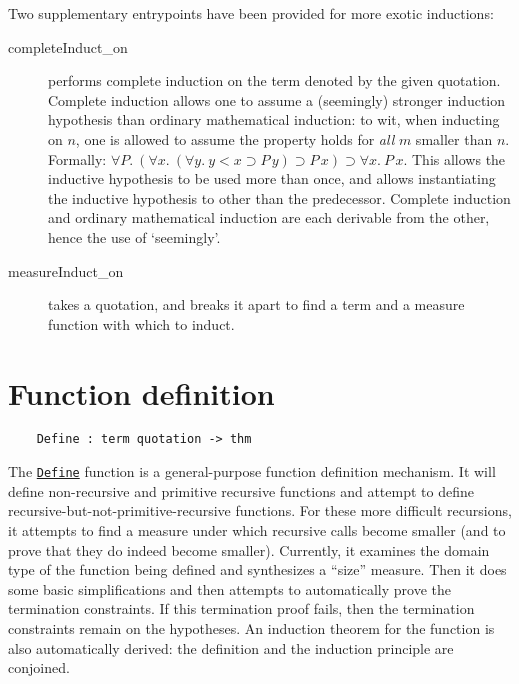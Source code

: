 \documentclass[12pt,fleqn,a4paper]{report}
\begin{document}
Two supplementary entrypoints have been provided for more exotic
inductions:
\begin{description}
\item [completeInduct\_on] performs complete
induction on the term denoted by the given quotation. Complete induction allows one to assume a
(seemingly) stronger induction hypothesis than ordinary mathematical
induction: to wit, when inducting on
$n$, one is allowed to assume the property holds for {\it all\/} $m$
smaller than $n$. Formally: $\forall P.\ (\forall x.\ (\forall y.\ y < x
\supset P\, y) \supset P\,x) \supset \forall x.\ P\,x$. This allows the
inductive hypothesis to be used more than once, and allows instantiating
the inductive hypothesis to other than the predecessor. Complete
induction and ordinary mathematical induction are each derivable from
the other, hence the use of `seemingly'.
\item [measureInduct\_on] takes a quotation, and breaks it apart
to find a term and a measure function with which to induct.
\end{description}

\section{Function definition}

\begin{verbatim}
    Define : term quotation -> thm
\end{verbatim}

The \underline{\tt Define} function is a general-purpose function definition
mechanism. It will define non-recursive and primitive recursive
functions and attempt to define recursive-but-not-primitive-recursive
functions. For these more difficult recursions, it attempts to find a
measure under which recursive calls become smaller (and to prove that
they do indeed become smaller). Currently, it examines the domain type
of the function being defined and synthesizes a ``size'' measure.  Then it
does some basic simplifications and then attempts to automatically prove
the termination constraints.  If this termination proof fails, then the
termination constraints remain on the hypotheses. An induction theorem
for the function is also automatically derived: the definition and the
induction principle are conjoined.
\end{document}
